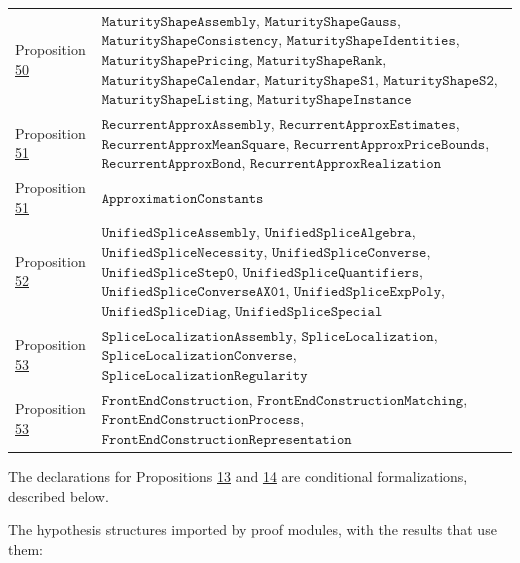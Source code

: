 \documentclass[11pt]{article}
\begin{document}
{\begin{longtable}{lP{384pt}}
Proposition \hyperref[res:Proposition-50]{50} & \(\texttt{MaturityShapeAssembly}\), \(\texttt{MaturityShapeGauss}\), \(\texttt{MaturityShapeConsistency}\), \(\texttt{MaturityShapeIdentities}\), \(\texttt{MaturityShapePricing}\), \(\texttt{MaturityShapeRank}\), \(\texttt{MaturityShapeCalendar}\), \(\texttt{MaturityShapeS1}\), \(\texttt{MaturityShapeS2}\), \(\texttt{MaturityShapeListing}\), \(\texttt{MaturityShapeInstance}\) \\
Proposition \hyperref[res:Proposition-51]{51} & \(\texttt{RecurrentApproxAssembly}\), \(\texttt{RecurrentApproxEstimates}\), \(\texttt{RecurrentApproxMeanSquare}\), \(\texttt{RecurrentApproxPriceBounds}\), \(\texttt{RecurrentApproxBond}\), \(\texttt{RecurrentApproxRealization}\) \\
Proposition \hyperref[res:Proposition-51]{51} & \(\texttt{ApproximationConstants}\) \\
Proposition \hyperref[res:Proposition-52]{52} & \(\texttt{UnifiedSpliceAssembly}\), \(\texttt{UnifiedSpliceAlgebra}\), \(\texttt{UnifiedSpliceNecessity}\), \(\texttt{UnifiedSpliceConverse}\), \(\texttt{UnifiedSpliceStep0}\), \(\texttt{UnifiedSpliceQuantifiers}\), \(\texttt{UnifiedSpliceConverseAX01}\), \(\texttt{UnifiedSpliceExpPoly}\), \(\texttt{UnifiedSpliceDiag}\), \(\texttt{UnifiedSpliceSpecial}\) \\
Proposition \hyperref[res:Proposition-53]{53} & \(\texttt{SpliceLocalizationAssembly}\), \(\texttt{SpliceLocalization}\), \(\texttt{SpliceLocalizationConverse}\), \(\texttt{SpliceLocalizationRegularity}\) \\
Proposition \hyperref[res:Proposition-53]{53} & \(\texttt{FrontEndConstruction}\), \(\texttt{FrontEndConstructionMatching}\), \(\texttt{FrontEndConstructionProcess}\), \(\texttt{FrontEndConstructionRepresentation}\) \\
\end{longtable}}

The declarations for Propositions \hyperref[res:Proposition-13]{13} and \hyperref[res:Proposition-14]{14} are conditional formalizations, described below.

The hypothesis structures imported by proof modules, with the results that use them:
\end{document}
